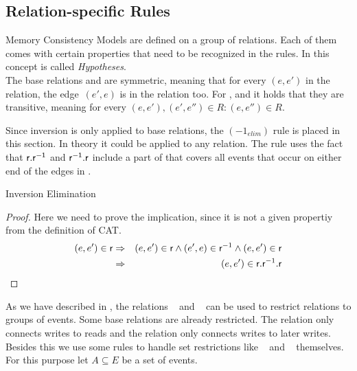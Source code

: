 \documentclass[a4paper,twoside,12pt, english]{article}
\begin{document}
\subsection{Relation-specific Rules}\label{sec:relationspecific}
Memory Consistency Models are defined on a group of relations. Each of them comes with certain properties that need to be recognized in the rules. In \cite{Gru+26} this concept is called \textit{Hypotheses}. \\
The base relations \loc{} and \ext{} are symmetric, meaning that for every $(e,e')$ in the relation, the edge~$(e',e)$ is in the relation too. For \po, \co{} and \loc{} it holds that they are transitive, meaning for every $(e,e'),(e',e'') \in R: (e,e'') \in R$. 
Since inversion is only applied to base relations, the $(-1_{elim})$ rule is placed in this section. In theory it could be applied to any relation. The rule uses the fact that $\sf r.r^{-1}$ and $\sf r^{-1}.r$ include a part of \id{} that covers all events that occur on either end of the edges in \relr.
\begin{rules}{Inversion Elimination}
\end{rules}
\begin{proof} Here we need to prove the implication, since it is not a given propertiy from the definition of CAT.
\begin{eqnarray*}
(e,e') \in  \textsf{\upshape r} &\Rightarrow & (e,e') \in  \textsf{\upshape r} \land (e',e) \in  \textsf{\upshape r}^{{-1}} \land (e,e') \in  \textsf{\upshape r} \\
&\Rightarrow & (e,e') \in  \textsf{\upshape r}.\textsf{\upshape r}^{{-1}}.\textsf{\upshape r}
\end{eqnarray*}
\end{proof}
As we have described in , the relations \relW~ and \relR~ can be used to restrict relations to groups of events. Some base relations are already restricted. The \rf{} relation only connects writes to reads and the \co{} relation only connects writes to later writes.
Besides this we use some rules to handle set restrictions like \relW~ and \relR~ themselves.
For this purpose let $A \subseteq E$ be a set of events. 
\end{document}
